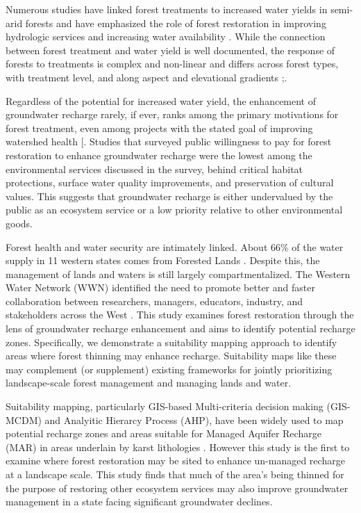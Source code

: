 \documentclass[
  number,
  preprint,
  3p,
  onecolumn]{elsarticle}
\begin{document}
Numerous studies have linked forest treatments to increased water yields
in semi-arid forests and have emphasized the role of forest restoration
in improving hydrologic services and increasing water availability
\citep{bosch1982, baker_effects_1986, gottfried_moderate_1991, smerdon_overview_2009, zou_streamflow_2010, wyatt2013, moreno_modeling_2015, simonit_impact_2015, wyatt2015, odonnell_forest_2018, schenk_impacts_2020, hibbert1979}.
While the connection between forest treatment and water yield is well
documented, the response of forests to treatments is complex and
non-linear and differs across forest types, with treatment level, and
along aspect and elevational gradients
\citep{delcampo2022, biederman_streamflow_2022, zou_streamflow_2010, hibbert1979, moore2005};.

Regardless of the potential for increased water yield, the enhancement
of groundwater recharge rarely, if ever, ranks among the primary
motivations for forest treatment, even among projects with the stated
goal of improving watershed health
{[}\citep{stanturf2014, filoso2017, allen2002, friederici2013, odonnell2016}.
Studies that surveyed public willingness to pay for forest restoration
to enhance groundwater recharge were the lowest among the environmental
services discussed in the survey, behind critical habitat protections,
surface water quality improvements, and preservation of cultural
values\citep{mueller2019, soder2022}. This suggests that groundwater
recharge is either undervalued by the public as an ecosystem service or
a low priority relative to other environmental goods.

Forest health and water security are intimately linked. About 66\% of
the water supply in 11 western states comes from Forested Lands
\citep{brown_source_2005}. Despite this, the management of lands and
waters is still largely compartmentalized. The Western Water Network
(WWN) identified the need to promote better and faster collaboration
between researchers, managers, educators, industry, and stakeholders
across the West \citep{hansen2024}. This study examines forest
restoration through the lens of groundwater recharge enhancement and
aims to identify potential recharge zones. Specifically, we demonstrate
a suitability mapping approach to identify areas where forest thinning
may enhance recharge. Suitability maps like these may complement (or
supplement) existing frameworks for jointly prioritizing landscape-scale
forest management and managing lands and water.

Suitability mapping, particularly GIS-based Multi-criteria decision
making (GIS-MCDM) and Analyitic Hierarcy Process (AHP), have been widely
used to map potential recharge zones and areas suitable for Managed
Aquifer Recharge (MAR) in areas underlain by karst lithologies
\citep{fathi2021, rajashekar2023, rahman2012, dar2020, shaban2006}.
However this study is the first to examine where forest restoration may
be sited to enhance un-managed recharge at a landscape scale. This study
finds that much of the area's being thinned for the purpose of restoring
other ecosystem services may also improve groundwater management in a
state facing significant groundwater declines.
\end{document}
